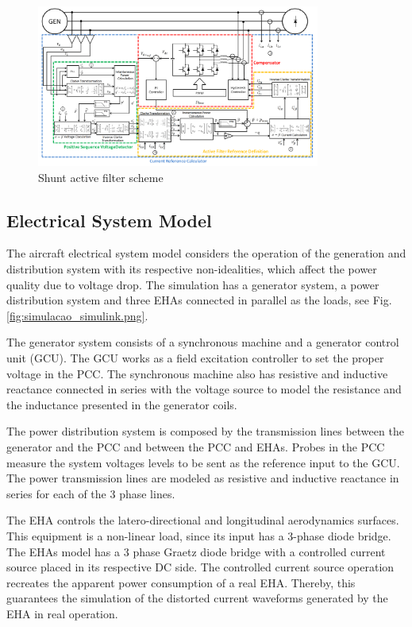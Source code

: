 \begin{figure}[!tb] %
	\centering
	\includegraphics[width=0.83\textwidth]{Figures/filtro_blocos_1.png}
	\caption{Shunt active filter scheme}
	\label{fig:filtro_blocos_1.png}
\end{figure}

\subsection{Electrical System Model}

The aircraft electrical system model considers the operation of the generation and distribution system with its respective non-idealities, which affect the power quality due to voltage drop. The simulation has a generator system, a power distribution system and three EHAs connected in parallel as the loads, see Fig. \ref{fig:simulacao_simulink.png}.

The generator system consists of a synchronous machine and a generator control unit (GCU). The GCU works as a field excitation controller to set the proper voltage in the PCC. The synchronous machine also has resistive and inductive reactance connected in series with the voltage source to model the resistance and the inductance presented in the generator coils.

The power distribution system is composed by the transmission lines between the generator and the PCC and between the PCC and EHAs. Probes in the PCC measure the system voltages levels to be sent as the reference input to the GCU. The power transmission lines are modeled as resistive and inductive reactance in series for each of the 3 phase lines.

The EHA controls the latero-directional and longitudinal aerodynamics surfaces. This equipment is a non-linear load, since its input has a 3-phase diode bridge. The EHAs model has a 3 phase Graetz diode bridge with a controlled current source placed in its respective DC side. The controlled current source operation recreates the apparent power consumption of a real EHA. Thereby, this guarantees the simulation of the distorted current waveforms generated by the EHA in real operation.


